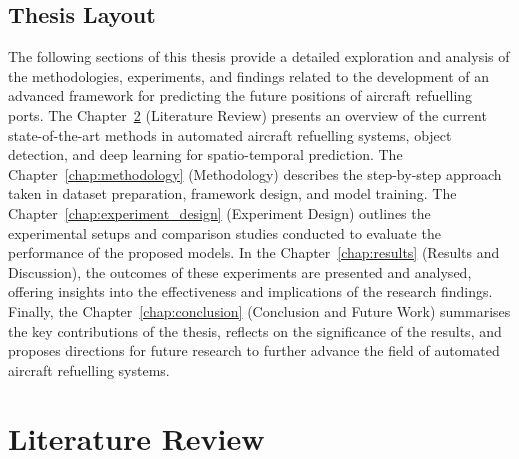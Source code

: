 \documentclass[12pt,oneside]{book} %
\begin{document}
\section{Thesis Layout}
The following sections of this thesis provide a detailed exploration and
analysis of the methodologies, experiments, and findings related to the
development of an advanced framework for predicting the future positions of
aircraft refuelling ports. The Chapter~\ref{chap:literature-review} (Literature
Review) presents an overview of the current state-of-the-art methods in
automated aircraft refuelling systems, object detection, and deep learning for
spatio-temporal prediction. The Chapter~\ref{chap:methodology} (Methodology)
describes the step-by-step approach taken in dataset preparation, framework
design, and model training. The Chapter~\ref{chap:experiment_design}
(Experiment Design) outlines the experimental setups and comparison studies
conducted to evaluate the performance of the proposed models. In the
Chapter~\ref{chap:results} (Results and Discussion), the outcomes of these
experiments are presented and analysed, offering insights into the
effectiveness and implications of the research findings. Finally, the
Chapter~\ref{chap:conclusion} (Conclusion and Future Work) summarises the key
contributions of the thesis, reflects on the significance of the results, and
proposes directions for future research to further advance the field of
automated aircraft refuelling systems.


\chapter{Literature Review}\label{chap:literature-review}
\end{document}
